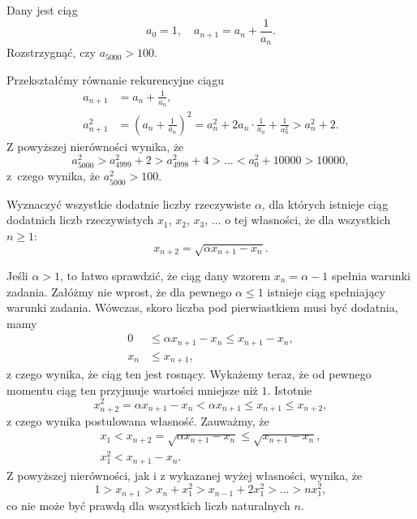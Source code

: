 \vspace{5px}

\begin{problem}{5}
	Dany jest ciąg
	\[
		a_0 = 1, \quad a_{n + 1} = a_n + \frac{1}{a_n}.
	\]
	Rozstrzygnąć, czy $a_{5000} > 100$.
\end{problem}


\noindent
Przekształćmy równanie rekurencyjne ciągu
\begin{align*}
	a_{n + 1} &= a_n + \frac{1}{a_n}, \\
	a_{n + 1}^2 &= \left(a_n + \frac{1}{a_n}\right)^2 = a_n^2 + 2 a_n \cdot \frac{1}{a_n} + \frac{1}{a_n^2}  > a_n^2 + 2.
\end{align*}
Z powyższej nierówności wynika, że
\[
	a_{5000}^2 > a_{4999}^2 + 2 > a_{4998}^2 + 4 > ... < a_0^2 + 10000 > 10000, 
\]
z~czego wynika, że $a_{5000}^2 > 100$.

\vspace{5px}

\begin{problem}{6}
	Wyznaczyć wszystkie dodatnie liczby rzeczywiste $\alpha$, dla których istnieje ciąg dodatnich liczb rzeczywistych $x_1$, $x_2$, $x_3$, $\dots$ o tej własności, że dla wszystkich $n\geqslant 1$:
	\[
		x_{n+2} = \sqrt{\alpha x_{n+1} - x_n}.
	\]
\end{problem}


\noindent
Jeśli $\alpha > 1$, to łatwo sprawdzić, że ciąg dany wzorem $x_n  = \alpha - 1$ spełnia warunki zadania. Załóżmy nie wprost, że dla pewnego $\alpha \leqslant 1$ istnieje ciąg spełniający warunki zadania. Wówczas, skoro liczba pod pierwiastkiem musi być dodatnia, mamy
\begin{align*}
 	0 &\leqslant \alpha x_{n+1} - x_n \leqslant x_{n + 1} - x_n, \\
 	x_n &\leqslant x_{n + 1},
\end{align*}
z czego wynika, że ciąg ten jest rosnący. Wykażemy teraz, że od pewnego momentu ciąg ten przyjmuje wartości mniejsze niż $1$. Istotnie
\[
	x_{n + 2}^2 = \alpha x_{n + 1} - x_n < \alpha x_{n + 1} \leqslant x_{n + 1} \leqslant x_{n + 2},
\]
z czego wynika postulowana własność.
Zauważmy, że
\begin{align*}
	x_1 < x_{n + 2} = \sqrt{\alpha x_{n+1} - x_n} \leqslant \sqrt{x_{n+1} - x_n}, \\
	x_1^2 < x_{n+1} - x_n.
\end{align*}
Z powyższej nierówności, jak i z wykazanej wyżej własności, wynika, że
\[
	1 > x_{n + 1} > x_n + x_{1}^2 > x_{n - 1} + 2x_{1}^2 > ... > nx_{1}^2,
\]
co nie może być prawdą dla wszystkich liczb naturalnych $n$.

